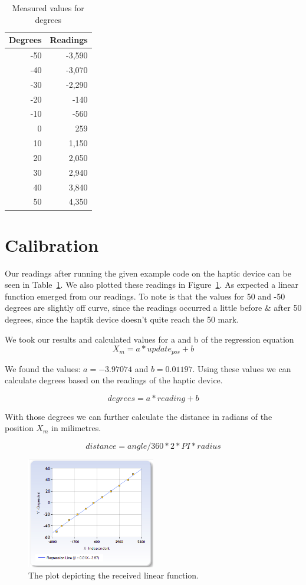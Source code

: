 \documentclass[12pt, a4paper]{article}
\begin{document}
\begin{table}[t]
\centering
\begin{tabular}{|r|r|}
\hline
Degrees & Readings \\ \hline
-50 & -3,590 \\ \hline
-40 & -3,070 \\ \hline
-30 & -2,290 \\ \hline
-20 & -140 \\ \hline
-10 & -560 \\ \hline
0 & 259 \\ \hline
10 & 1,150 \\ \hline
20 & 2,050 \\ \hline
30 & 2,940 \\ \hline
40 & 3,840 \\ \hline
50 & 4,350 \\ \hline
\end{tabular}
\caption{Measured values for degrees}
\label{table:readings}
\end{table}

\section{Calibration} \label{sec:cal}
Our readings after running the given example code on the haptic device can be seen in Table~\ref{table:readings}. We also plotted these readings in Figure~\ref{fig:readings_plot}. As expected a linear function emerged from our readings. To note is that the values for 50 and -50 degrees are slightly off curve, since the readings occurred a little before \& after 50 degrees, since the haptik device doesn’t quite reach the 50 mark.

We took our results and calculated values for a and b of the regression equation
\begin{equation*}
X_m = a * update_{pos} + b
\end{equation*}

We found the values: $a = -3.97074$ and $b = 0.01197$. Using these values we can calculate degrees based on the readings of the haptic device.

\begin{equation*}
degrees = a * reading + b
\end{equation*}

With those degrees we can further calculate the distance in radians of the position $X_m$ in milimetres.

\begin{equation*}
distance = angle / 360 * 2 * PI * radius
\end{equation*}


\begin{figure}
	\centering
	\includegraphics[width=0.5\textwidth]{readings_plot}
	\caption{The plot depicting the received linear function.}
	\label{fig:readings_plot}
\end{figure}


%
%
\end{document}
